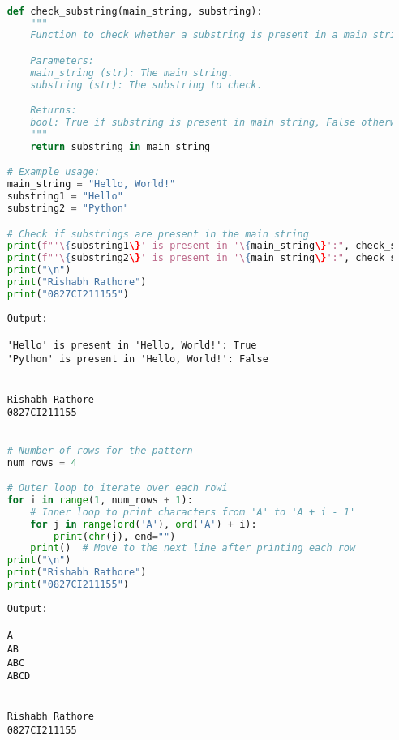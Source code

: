 \documentclass{report}
\begin{document}
\sol{}
\begin{lstlisting}[language=Python]

	def check_substring(main_string, substring):
		"""
		Function to check whether a substring is present in a main string.

		Parameters:
		main_string (str): The main string.
		substring (str): The substring to check.

		Returns:
		bool: True if substring is present in main string, False otherwise.
		"""
		return substring in main_string

	# Example usage:
	main_string = "Hello, World!"
	substring1 = "Hello"
	substring2 = "Python"

	# Check if substrings are present in the main string
	print(f"'\{substring1\}' is present in '\{main_string\}':", check_substring(main_string, substring1))
	print(f"'\{substring2\}' is present in '\{main_string\}':", check_substring(main_string, substring2))
	print("\n")
	print("Rishabh Rathore")
	print("0827CI211155")

\end{lstlisting}

\begin{verbatim}
	Output:
	
	'Hello' is present in 'Hello, World!': True
	'Python' is present in 'Hello, World!': False
	
	
	Rishabh Rathore
	0827CI211155
\end{verbatim}
\newpage


\sol{}
\begin{lstlisting}[language=Python]

	# Number of rows for the pattern
	num_rows = 4

	# Outer loop to iterate over each rowi
	for i in range(1, num_rows + 1):
		# Inner loop to print characters from 'A' to 'A + i - 1'
		for j in range(ord('A'), ord('A') + i):
			print(chr(j), end="")
		print()  # Move to the next line after printing each row
	print("\n")
	print("Rishabh Rathore")
	print("0827CI211155")
\end{lstlisting}

\begin{verbatim}
	Output:

	A
	AB
	ABC
	ABCD
	
	
	Rishabh Rathore
	0827CI211155

\end{verbatim}
\newpage
\end{document}
